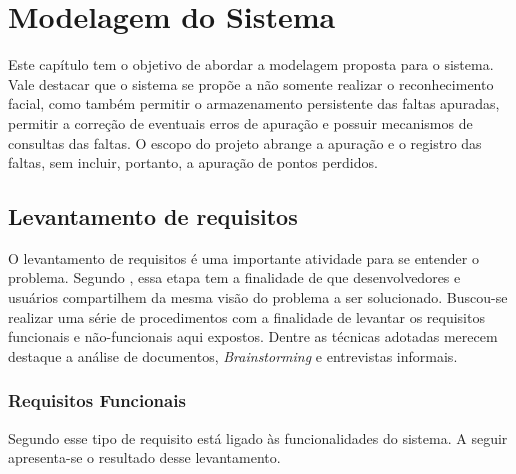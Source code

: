\chapter{Modelagem do Sistema}
\noindent
Este capítulo tem o objetivo de abordar a modelagem proposta para o sistema. Vale destacar que o sistema se propõe a não somente realizar o reconhecimento facial, como também permitir o armazenamento persistente das faltas apuradas, permitir a correção de eventuais erros de apuração e possuir mecanismos de consultas das faltas. O escopo do projeto abrange a apuração e o registro das faltas, sem incluir, portanto, a apuração de pontos perdidos.

\section{Levantamento de requisitos}
\noindent
O levantamento de requisitos é uma importante atividade para se entender o problema. Segundo \citep{bezerra}, essa etapa tem a finalidade de que desenvolvedores e usuários compartilhem da mesma visão do problema a ser solucionado. Buscou-se realizar uma série de procedimentos com a finalidade de levantar os requisitos funcionais e não-funcionais aqui expostos. Dentre as técnicas adotadas merecem destaque a análise de documentos, \textit{Brainstorming} e entrevistas informais.

\subsection{Requisitos Funcionais} 

Segundo \citep{bezerra} esse tipo de requisito está ligado às funcionalidades do sistema.  A seguir apresenta-se o resultado desse levantamento.


